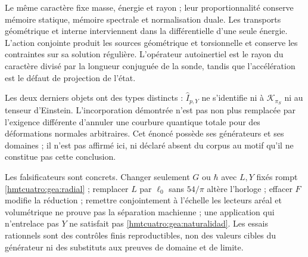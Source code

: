 Le même caractère fixe masse, énergie et rayon ; leur proportionnalité conserve mémoire statique, mémoire spectrale et normalisation duale. Les transports géométrique et interne interviennent dans la différentielle d’une seule énergie. L’action conjointe produit les sources géométrique et torsionnelle et conserve les contraintes sur sa solution régulière. L’opérateur autoinertiel est le rayon du caractère divisé par la longueur conjuguée de la sonde, tandis que l’accélération est le défaut de projection de l’état.

Les deux derniers objets ont des types distincts : $\widehat I_{p,Y}$ ne s’identifie ni à $\mathcal K_{\pi_S}$ ni au tenseur d’Einstein. L’incorporation démontrée n’est pas non plus remplacée par l’exigence différente d’annuler une courbure quantique totale pour des déformations normales arbitraires. Cet énoncé possède ses générateurs et ses domaines ; il n’est pas affirmé ici, ni déclaré absent du corpus au motif qu’il ne constitue pas cette conclusion.

Les falsificateurs sont concrets. Changer seulement $G$ ou $\hbar$ avec $L,Y$ fixés rompt \eqref{hmtcuatro:gea:radial} ; remplacer $L$ par $\ell_0$ sans $54/\pi$ altère l’horloge ; effacer $F$ modifie la réduction ; remettre conjointement à l’échelle les lecteurs aréal et volumétrique ne prouve pas la séparation machienne ; une application qui n’entrelace pas $Y$ ne satisfait pas \eqref{hmtcuatro:gea:naturalidad}. Les essais rationnels sont des contrôles finis reproductibles, non des valeurs cibles du générateur ni des substituts aux preuves de domaine et de limite.
